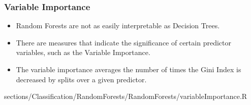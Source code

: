 	\subsubsection{Variable Importance}
		\RTheory
		{
			\begin{itemize}
			    \item Random Forests are not as easily interpretable as Decision Trees.
			    \item There are measures that indicate the significance of certain predictor variables, such as the Variable Importance.
			    \item The variable importance averages the number of times the Gini Index is decreased by splits over a given predictor.
			\end{itemize}
		}
		{
			sections/Classification/RandomForests/RandomForests/variableImportance.R
		}
		